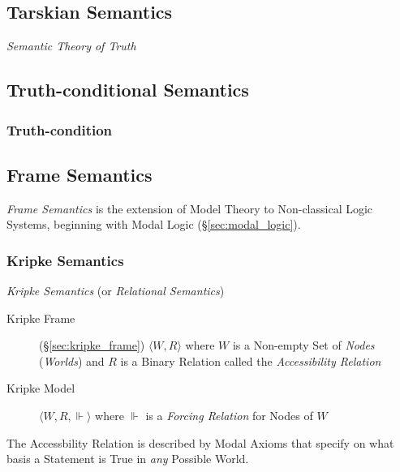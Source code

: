 \subsection{Tarskian Semantics}\label{sec:tarski_semantics}

\emph{Semantic Theory of Truth}



\subsection{Truth-conditional Semantics}
\label{sec:truth_conditional_semantics}

\subsubsection{Truth-condition}\label{sec:truth_condition}



\subsection{Frame Semantics}\label{sec:frame_semantics}

\emph{Frame Semantics} is the extension of Model Theory to
Non-classical Logic Systems, beginning with Modal Logic
(\S\ref{sec:modal_logic}).



\subsubsection{Kripke Semantics}\label{sec:kripke_semantics}

\emph{Kripke Semantics} (or \emph{Relational Semantics})

\begin{description}
\item [Kripke Frame] (\S\ref{sec:kripke_frame}) $\langle W,R \rangle$
  where $W$ is a Non-empty Set of \emph{Nodes} (\emph{Worlds}) and $R$
  is a Binary Relation called the \emph{Accessibility Relation}
\item [Kripke Model] $\langle W,R,\Vdash \rangle$ where $\Vdash$ is a
  \emph{Forcing Relation} for Nodes of $W$
\end{description}
The Accessbility Relation is described by Modal Axioms that specify on
what basis a Statement is True in \emph{any} Possible World.

